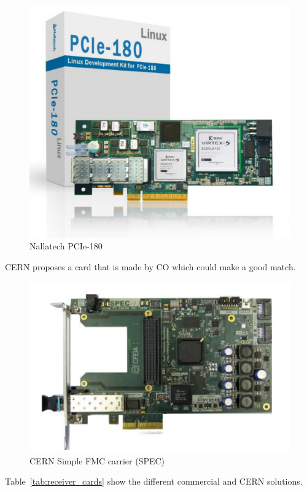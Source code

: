 \begin{figure}[H]
\caption{Nallatech PCIe-180}
\label{fig:nallatech}
\centering
\includegraphics[scale=0.3]{Nallatech_PCIe-180.pdf}
\end{figure}

\gls{CERN} proposes a card that is made by \gls{CO} which could make a good match.

\begin{figure}[H]
\caption{CERN Simple FMC carrier (SPEC)}
\label{fig:spec}
\centering
\includegraphics[scale=0.3]{spec_top.pdf}
\end{figure}

Table~\ref{tab:receiver_cards} show the different commercial and CERN solutions.

